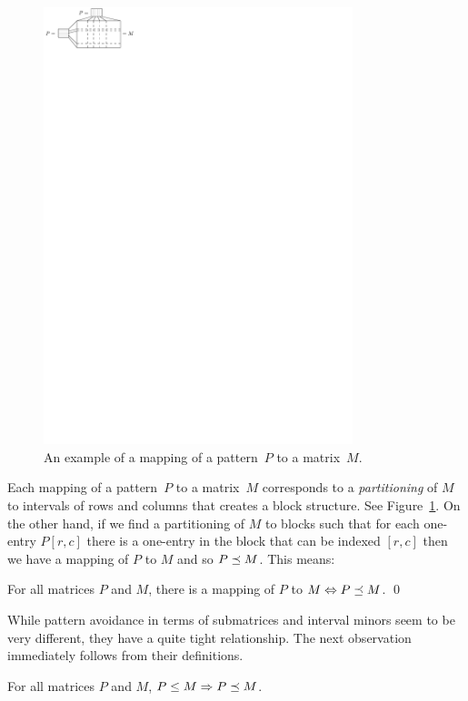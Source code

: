 \begin{figure}[!ht]
\centering
\includegraphics[width=90mm]{img/mapping.pdf}
\caption{An example of a mapping of a pattern~$P$ to a matrix~$M$.}
\label{fig:mapping}
\end{figure}

Each mapping of a pattern~$P$ to a matrix~$M$ corresponds to a \emph{partitioning} of $M$ to intervals of rows and columns that creates a block structure. See Figure~\ref{fig:mapping}. On the other hand, if we find a partitioning of $M$ to blocks such that for each one-entry $P[r,c]$ there is a one-entry in the block that can be indexed $[r,c]$ then we have a mapping of $P$ to $M$ and so $P\preceq M$. This means:

\begin{obs}
For all matrices $P$ and $M$, there is a mapping of $P$ to $M\Leftrightarrow P\preceq M$. \qed
\end{obs}

While pattern avoidance in terms of submatrices and interval minors seem to be very different, they have a quite tight relationship. The next observation immediately follows from their definitions.

\begin{obs}
\label{obs:submin}
For all matrices $P$ and $M$, $P\leq M\Rightarrow P\preceq M$.
\end{obs}

